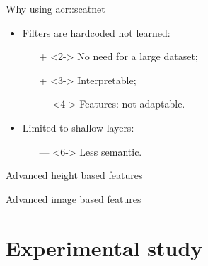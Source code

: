 \documentclass[12pt]{beamer}
\begin{document}
            \begin{frame}{Why using \texorpdfstring{\acrshort*{acr::scatnet}}{ScatNet}}
                \begin{itemize}[label=\(\blacktriangleright\), font=\color{IGNGreen}]
                    \item<1-> Filters are hardcoded not learned:
                    \begin{itemize}
                        \item[\color{IGNDarkGreen} +]<2-> No need for a large dataset;
                        \item[\color{IGNDarkGreen} +]<3-> Interpretable; 
                        \item[\color{red} ---]<4-> Features: not adaptable.
                    \end{itemize}
                    \item<5-> Limited to shallow layers:
                    \begin{itemize}
                        \item[\color{red} ---]<6-> Less semantic.
                    \end{itemize}
                \end{itemize}
            \end{frame}

            \begin{frame}{Advanced height based features}
                \centering
                
            \end{frame}

            \begin{frame}{Advanced image based features}
                \centering
                
            \end{frame}

    \section{Experimental study}
\end{document}

